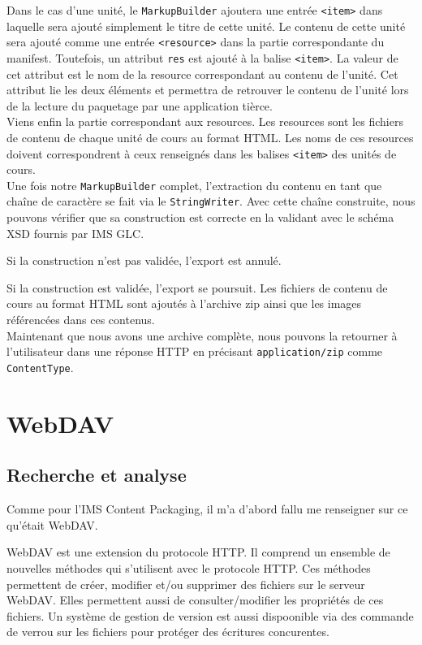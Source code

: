 Dans le cas d'une unité, le {\tt MarkupBuilder} ajoutera une entrée {\tt <item>}
dans laquelle sera ajouté simplement le titre de cette unité. Le contenu de
cette unité sera ajouté comme une entrée {\tt <resource>} dans la partie
correspondante du manifest. Toutefois, un attribut {\tt res} est ajouté à la
balise {\tt <item>}. La valeur de cet attribut est le nom de la resource
correspondant au contenu de l'unité. Cet attribut lie les deux éléments et
permettra de retrouver le contenu de l'unité lors de la lecture du paquetage par
une application tièrce.\\

Viens enfin la partie correspondant aux resources. Les resources sont les
fichiers de contenu de chaque unité de cours au format HTML. Les noms de ces
resources doivent correspondrent à ceux renseignés dans les balises {\tt <item>}
des unités de cours.\\

Une fois notre {\tt MarkupBuilder} complet, l'extraction du contenu en tant que
chaîne de caractère se fait via le {\tt StringWriter}. Avec cette chaîne
construite, nous pouvons vérifier que sa construction est correcte en la
validant avec le schéma XSD fournis par IMS GLC.

Si la construction n'est pas validée, l'export est annulé.

Si la construction est validée, l'export se poursuit. Les fichiers de contenu de
cours au format HTML sont ajoutés à l'archive zip ainsi que les images
référencées dans ces contenus.\\

Maintenant que nous avons une archive complète, nous pouvons la retourner à
l'utilisateur dans une réponse HTTP en précisant {\tt application/zip} comme
{\tt ContentType}.

\section{WebDAV}
\subsection{Recherche et analyse}
Comme pour l'IMS Content Packaging, il m'a d'abord fallu me renseigner sur ce
qu'était WebDAV.

WebDAV est une extension du protocole HTTP. Il comprend un ensemble de nouvelles
méthodes qui s'utilisent avec le protocole HTTP. Ces méthodes permettent de
créer, modifier et/ou supprimer des fichiers sur le serveur WebDAV. Elles
permettent aussi de consulter/modifier les propriétés de ces fichiers. Un
système de gestion de version est aussi dispoonible via des commande de verrou
sur les fichiers pour protéger des écritures concurentes.

